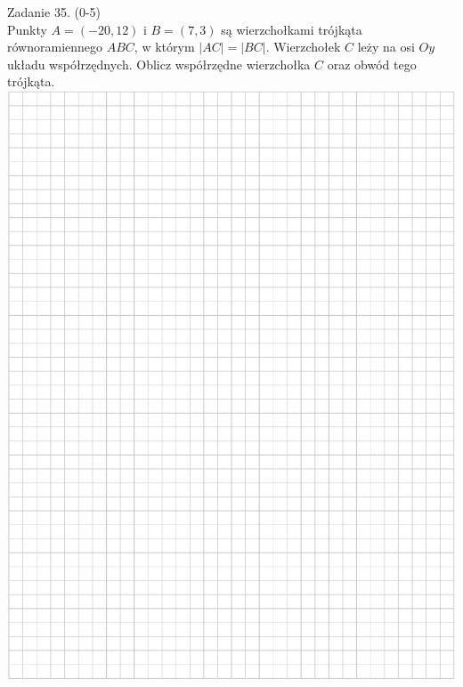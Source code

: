 \documentclass[10pt]{article}
\begin{document}
Zadanie 35. (0-5)\\
Punkty \(A=(-20,12)\) i \(B=(7,3)\) są wierzchołkami trójkąta równoramiennego \(A B C\), w którym \(|A C|=|B C|\). Wierzchołek \(C\) leży na osi \(O y \quad\) układu współrzędnych. Oblicz współrzędne wierzchołka \(C\) oraz obwód tego trójkąta.\\
\includegraphics[max width=\textwidth, center]{2024_11_21_46d945490f1b2eff1c8eg-22}\\
\end{document}
